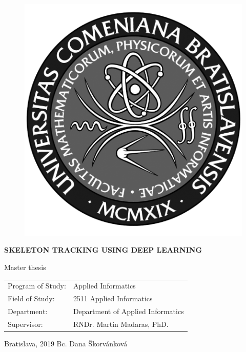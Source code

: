 \documentclass[12pt, a4paper, oneside]{book}
\newcommand\mftitle{Skeleton Tracking using Deep Learning}
\newcommand\mfthesistype{Master thesis}
\newcommand\mfauthor{Bc. Dana Škorvánková}
\newcommand\mfadvisor{RNDr. Martin Madaras, PhD.}
\newcommand\mfplacedate{Bratislava, 2019}
\begin{document}
\vfill
\begin{figure}[!hbt]
\begin{center}
\includegraphics{images/logo_fmph_dark}
\label{img:logo_dark}
\end{center}
\end{figure}
\begin{center}
\begin{minipage}{0.8\textwidth}
\centerline{\textbf{\Large\MakeUppercase{\mftitle}}}
\smallskip
\centerline{\mfthesistype}
\end{minipage}
\end{center}
\vfill
\begin{tabular}{l l}
Program of Study: & Applied Informatics\\
Field of Study: & 2511 Applied Informatics\\
Department: & Department of Applied Informatics\\
Supervisor: & \mfadvisor
\end{tabular}
\vfill
\noindent
\mfplacedate \hfill
\mfauthor
\eject 

\end{document}
